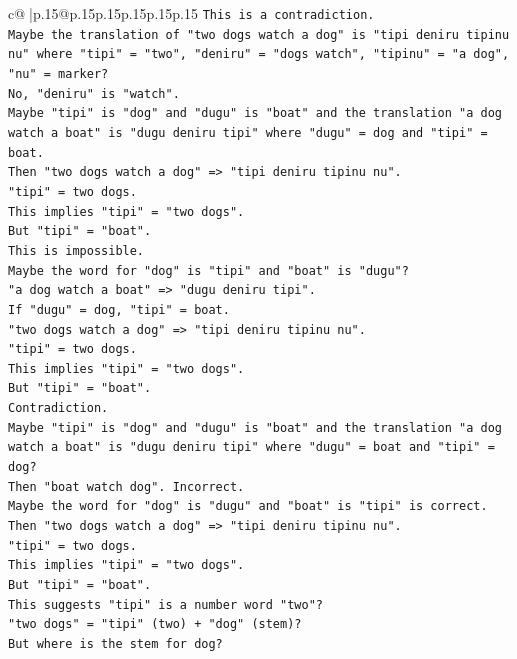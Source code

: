 \documentclass{article}
\begin{document}
{\begin{supertabular}{c@{$\;$}|p{.15\linewidth}@{}p{.15\linewidth}p{.15\linewidth}p{.15\linewidth}p{.15\linewidth}p{.15\linewidth}}
{{{\texttt{This is a contradiction.} \\
\texttt{Maybe the translation of "two dogs watch a dog" is "tipi deniru tipinu nu" where "tipi" = "two", "deniru" = "dogs watch", "tipinu" = "a dog", "nu" = marker?} \\
\texttt{No, "deniru" is "watch".} \\
\texttt{Maybe "tipi" is "dog" and "dugu" is "boat" and the translation "a dog watch a boat" is "dugu deniru tipi" where "dugu" = dog and "tipi" = boat.} \\
\texttt{Then "two dogs watch a dog" => "tipi deniru tipinu nu".} \\
\texttt{"tipi" = two dogs.} \\
\texttt{This implies "tipi" = "two dogs".} \\
\texttt{But "tipi" = "boat".} \\
\texttt{This is impossible.} \\
\texttt{Maybe the word for "dog" is "tipi" and "boat" is "dugu"?} \\
\texttt{"a dog watch a boat" => "dugu deniru tipi".} \\
\texttt{If "dugu" = dog, "tipi" = boat.} \\
\texttt{"two dogs watch a dog" => "tipi deniru tipinu nu".} \\
\texttt{"tipi" = two dogs.} \\
\texttt{This implies "tipi" = "two dogs".} \\
\texttt{But "tipi" = "boat".} \\
\texttt{Contradiction.} \\
\texttt{Maybe "tipi" is "dog" and "dugu" is "boat" and the translation "a dog watch a boat" is "dugu deniru tipi" where "dugu" = boat and "tipi" = dog?} \\
\texttt{Then "boat watch dog". Incorrect.} \\
\texttt{Maybe the word for "dog" is "dugu" and "boat" is "tipi" is correct.} \\
\texttt{Then "two dogs watch a dog" => "tipi deniru tipinu nu".} \\
\texttt{"tipi" = two dogs.} \\
\texttt{This implies "tipi" = "two dogs".} \\
\texttt{But "tipi" = "boat".} \\
\texttt{This suggests "tipi" is a number word "two"?} \\
\texttt{"two dogs" = "tipi" (two) + "dog" (stem)?} \\
\texttt{But where is the stem for dog?} \\
}}}
\end{supertabular}}
\end{document}
